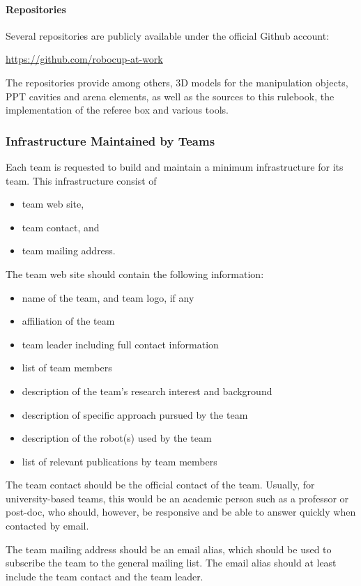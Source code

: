 \paragraph{Repositories}
Several repositories are publicly available under the official \RCAW Github account:
\begin{center}
\url{https://github.com/robocup-at-work}
\end{center}

The repositories provide among others, 3D models for the manipulation objects, PPT cavities and arena elements, as well as the sources to this rulebook, the implementation of the referee box and various tools.


\subsubsection{Infrastructure Maintained by Teams}
Each team is requested to build and maintain a minimum infrastructure for its team. This infrastructure consist of 

\begin{itemize}
	\item team web site,
	\item team contact, and
	\item team mailing address.
\end{itemize}

The team web site should contain the following information:

\begin{itemize}
	\item name of the team, and team logo, if any
	\item affiliation of the team
	\item team leader including full contact information
	\item list of team members
	\item description of the team's research interest and background
	\item description of specific approach pursued by the team
	\item description of the robot(s) used by the team
	\item list of relevant publications by team members

\end{itemize}

The team contact should be the official contact of the team. Usually, for university-based teams, this would be an academic person such as a professor or post-doc, who should, however, be responsive and be able to answer quickly when contacted by email.
\par
The team mailing address should be an email alias, which should be used to subscribe the team to the general \RCAW mailing list. The email alias should at least include the team contact and the team leader.
